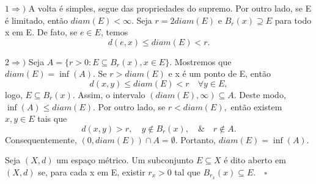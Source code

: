 \documentclass[metric_notes.tex]{subfiles}
\begin{document}
\begin{proof*}
	\(1 \Rightarrow )\) A volta é simples, segue das propriedades do supremo. Por outro lado, se E é limitado, então \(diam(E) < \infty\). Seja
	\(r=2diam(E)\) e \(B_{r}(x)\supseteq{E}\) para todo x em E. De fato, se \(e\in E\), temos
	\[
		d(e, x)\leq diam(E) < r.
	\]

	\(2 \Rightarrow )\) Seja \(A = \{r>0: E \subseteq{B_{r}(x)}, x\in E\}\). Mostremos que \(diam(E) = \inf{(A)}.\) Se \(r > diam(E)\) e x
	é um ponto de E, então
	\[
		d(x, y)\leq diam(E) < r\quad \forall y\in E,
	\]
	logo, \(E\subseteq{B_{r}(x)}\). Assim, o intervalo \((diam(E), \infty)\subseteq{A}.\) Deste modo, \(\inf{(A)}\leq diam(E).\)
	Por outro lado, se \(r < diam(E),\) então existem \(x, y\in E\) tais que
	\[
		d(x, y) > r,\quad y\not\in B_{r}(x),\quad \&\quad r\not\in A.
	\]
	Consequentemente, \((0, diam(E))\cap A = \emptyset.\) Portanto, \(diam(E) = \inf{(A)}.\) \qedsymbol
\end{proof*}
\begin{def*}
	Seja \((X, d)\) um espaço métrico. Um subconjunto \(E\subseteq{X}\) é dito aberto em \((X, d)\) se, para cada
	x em E, existir \(r_{x} > 0\) tal que \(B_{r_{x}}(x)\subseteq{E}.\quad\square\)
\end{def*}
\end{document}
